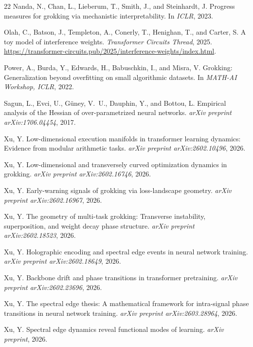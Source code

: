 \documentclass[11pt]{article}
\begin{document}
\begin{thebibliography}{22}
Nanda, N., Chan, L., Lieberum, T., Smith, J., and Steinhardt, J.
\newblock Progress measures for grokking via mechanistic interpretability.
\newblock In \emph{ICLR}, 2023.

Olah, C., Batson, J., Templeton, A., Conerly, T., Henighan, T., and Carter, S.
\newblock A toy model of interference weights.
\newblock \emph{Transformer Circuits Thread}, 2025.
\newblock \url{https://transformer-circuits.pub/2025/interference-weights/index.html}.

Power, A., Burda, Y., Edwards, H., Babuschkin, I., and Misra, V.
\newblock Grokking: Generalization beyond overfitting on small algorithmic datasets.
\newblock In \emph{MATH-AI Workshop, ICLR}, 2022.

Sagun, L., Evci, U., G\"uney, V.~U., Dauphin, Y., and Bottou, L.
\newblock Empirical analysis of the {H}essian of over-parametrized neural networks.
\newblock \emph{arXiv preprint arXiv:1706.04454}, 2017.

Xu, Y.
\newblock Low-dimensional execution manifolds in transformer learning dynamics: Evidence from modular arithmetic tasks.
\newblock \emph{arXiv preprint arXiv:2602.10496}, 2026.

Xu, Y.
\newblock Low-dimensional and transversely curved optimization dynamics in grokking.
\newblock \emph{arXiv preprint arXiv:2602.16746}, 2026.

Xu, Y.
\newblock Early-warning signals of grokking via loss-landscape geometry.
\newblock \emph{arXiv preprint arXiv:2602.16967}, 2026.

Xu, Y.
\newblock The geometry of multi-task grokking: Transverse instability, superposition, and weight decay phase structure.
\newblock \emph{arXiv preprint arXiv:2602.18523}, 2026.

Xu, Y.
\newblock Holographic encoding and spectral edge events in neural network training.
\newblock \emph{arXiv preprint arXiv:2602.18649}, 2026.

Xu, Y.
\newblock Backbone drift and phase transitions in transformer pretraining.
\newblock \emph{arXiv preprint arXiv:2602.23696}, 2026.

Xu, Y.
\newblock The spectral edge thesis: A mathematical framework for intra-signal phase transitions in neural network training.
\newblock \emph{arXiv preprint arXiv:2603.28964}, 2026.

Xu, Y.
\newblock Spectral edge dynamics reveal functional modes of learning.
\newblock \emph{arXiv preprint}, 2026.

\end{thebibliography}
\end{document}
